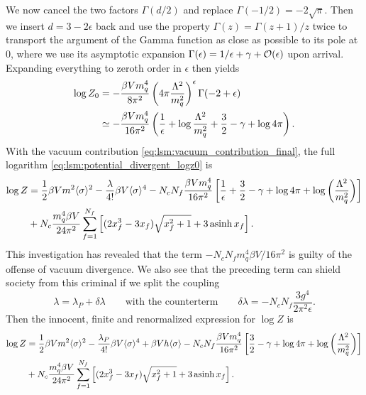 We now cancel the two factors $\Gamma(d/2)$ and replace $\Gamma(-1/2) = -2\sqrt{\pi}$.
Then we insert $d = 3 - 2 \epsilon$ back and use the property $\Gamma(z) = \Gamma(z+1) / z$ twice to transport the argument of the Gamma function as close as possible to its pole at $0$,
where we use its asymptotic expansion $\Gamma(\epsilon) = 1/\epsilon + \gamma + \mathcal{O}(\epsilon)$ upon arrival.
Expanding everything to zeroth order in $\epsilon$ then yields
\begin{equation}
\begin{split}
	\log Z_0 &=       -\frac{\beta V m_q^4}{8 \pi^2} \left( 4 \pi \frac{\Lambda^2}{m_q^2} \right)^\epsilon \Gamma(-2 + \epsilon) \\
	         &\simeq -\frac{\beta V m_q^4}{16 \pi^2} \left( \frac{1}{\epsilon} + \log \frac{\Lambda^2}{m_q^2} + \frac32 - \gamma + \log 4 \pi \right) .
\end{split}
\label{eq:lsm:vacuum_contribution_final}
\end{equation}
With the vacuum contribution \eqref{eq:lsm:vacuum_contribution_final}, the full logarithm \eqref{eq:lsm:potential_divergent_logz0} is
\begin{equation}
\begin{split}
	\log Z &= \frac12 \beta V m^2 \langle \sigma \rangle^2 - \frac{\lambda}{4!} \beta V \langle \sigma \rangle^4 - N_c N_f \frac{\beta V m_q^4}{16 \pi^2} \left[ \frac{1}{\epsilon} + \frac{3}{2} - \gamma + \log 4 \pi + \log\left(\frac{{\Lambda}^2}{m_q^2}\right) \right] \\
	       &+ N_c \frac{m_q^4 \beta V}{24 \pi^2} \sum_{f=1}^{N_f} \left[ (2 x_f^3 - 3x_f) \sqrt{x_f^2 + 1} + 3 \operatorname{asinh} x_f \right] .
\end{split}
\end{equation}
This investigation has revealed that the term $-N_c N_f m_q^4 \beta V / 16 \pi^2$ is guilty of the offense of vacuum divergence.
We also see that the preceding term can shield society from this criminal if we split the coupling 
\begin{equation}
	\lambda = \lambda_P + \delta\lambda
	\qquad \text{with the counterterm} \qquad
	\delta\lambda = -N_c N_f \frac{3 g^4}{2 \pi^2 \epsilon} .
\end{equation}
Then the innocent, finite and renormalized expression for $\log Z$ is
\begin{equation}
\begin{split}
	\log Z &= \frac12 \beta V m^2 \langle \sigma \rangle^2 - \frac{\lambda_P}{4!} \beta V \langle \sigma \rangle^4 + \beta V h \langle \sigma \rangle - N_c N_f \frac{\beta V m_q^4}{16 \pi^2} \left[ \frac{3}{2} - \gamma + \log 4 \pi + \log\left(\frac{{\Lambda}^2}{m_q^2}\right) \right] \\
	       &+ N_c \frac{m_q^4 \beta V}{24 \pi^2} \sum_{f=1}^{N_f} \left[ (2 x_f^3 - 3x_f) \sqrt{x_f^2 + 1} + 3 \operatorname{asinh} x_f \right] .
\end{split}
\end{equation}

